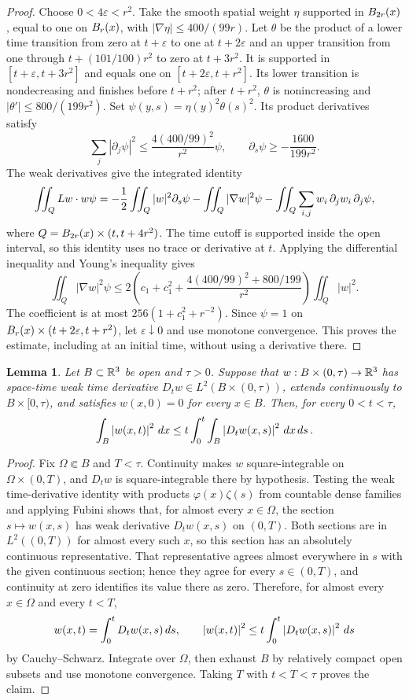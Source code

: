 \documentclass[11pt,letterpaper]{article}
\numberwithin{equation}{section}
\theoremstyle{plain}
\newtheorem{lemma}[theorem]{Lemma}
\theoremstyle{definition}
\theoremstyle{remark}
\begin{document}
\begin{proof}
Choose $0<4\varepsilon<r^2$. Take the smooth spatial weight $\eta$
supported in $B_{2r}(x)$, equal to one on $B_{r}(x)$, with
$|\nabla\eta|\le400/(99r)$. Let $\theta$ be the product of a lower
time transition from zero at $t+\varepsilon$ to one at $t+2\varepsilon$
and an upper transition from one through $t+(101/100)r^2$ to zero at
$t+3r^2$. It is supported in $[t+\varepsilon,t+3r^2]$ and equals one
on $[t+2\varepsilon,t+r^2]$. Its lower transition is nondecreasing and
finishes before $t+r^2$; after $t+r^2$, $\theta$ is nonincreasing and
$|\theta'|\le800/(199r^2)$. Set $\psi(y,s)=\eta(y)^2\theta(s)^2$.
Its product derivatives satisfy
\[
\sum_j|\partial_j\psi|^2\le
  \frac{4(400/99)^2}{r^2}\psi,\qquad
\partial_s\psi\ge-\frac{1600}{199r^2}.
\]
The weak derivatives give the integrated identity
\[
\iint_QL w\cdot w\psi
=-\frac12\iint_Q|w|^2\partial_s\psi
 -\iint_Q|\nabla w|^2\psi
 -\iint_Q\sum_{i,j}w_i\,\partial_jw_i\,\partial_j\psi,
\]
where $Q=B_{2r}(x)\times(t,t+4r^2)$. The time cutoff is supported inside
the open interval, so this identity uses no trace or derivative at $t$.
Applying the differential inequality and Young's inequality gives
\[
\iint_Q|\nabla w|^2\psi
\le2\left(c_1+c_1^2+
  \frac{4(400/99)^2+800/199}{r^2}\right)\iint_Q|w|^2.
\]
The coefficient is at most $256(1+c_1^2+r^{-2})$. Since $\psi=1$ on
$B_{r}(x)\times(t+2\varepsilon,t+r^2)$, let $\varepsilon\downarrow0$
and use monotone convergence. This proves the estimate, including at an
initial time, without using a derivative there.
\end{proof}

\begin{lemma}\label{lem:ftc-small-time}
Let $B\subset\mathbb{R}^3$ be open and $\tau>0$. Suppose that $w:B\times(0,\tau)\to\mathbb{R}^3$ has space-time weak time derivative $D_tw\in L^2(B\times(0,\tau))$, extends continuously to $B\times[0,\tau)$, and satisfies $w(x,0)=0$ for every $x\in B$. Then, for every $0<t<\tau$,
\[
\int_B\left\lvert w(x,t)\right\rvert^2\,dx
\le t\int_0^t\int_B\left\lvert D_tw(x,s)\right\rvert^2\,dx\,ds\,.
\]
\end{lemma}

\begin{proof}
Fix $\Omega\Subset B$ and $T<\tau$. Continuity makes $w$ square-integrable on $\Omega\times(0,T)$, and $D_tw$ is square-integrable there by hypothesis. Testing the weak time-derivative identity with products $\varphi(x)\zeta(s)$ from countable dense families and applying Fubini shows that, for almost every $x\in\Omega$, the section $s\mapsto w(x,s)$ has weak derivative $D_tw(x,s)$ on $(0,T)$. Both sections are in $L^2((0,T))$ for almost every such $x$, so this section has an absolutely continuous representative. That representative agrees almost everywhere in $s$ with the given continuous section; hence they agree for every $s\in(0,T)$, and continuity at zero identifies its value there as zero. Therefore, for almost every $x\in\Omega$ and every $t<T$,
\[
w(x,t)=\int_0^t D_tw(x,s)\,ds,\qquad
\left\lvert w(x,t)\right\rvert^2\le t\int_0^t\left\lvert D_tw(x,s)\right\rvert^2\,ds
\]
by Cauchy--Schwarz. Integrate over $\Omega$, then exhaust $B$ by relatively compact open subsets and use monotone convergence. Taking $T$ with $t<T<\tau$ proves the claim.
\end{proof}
\end{document}
